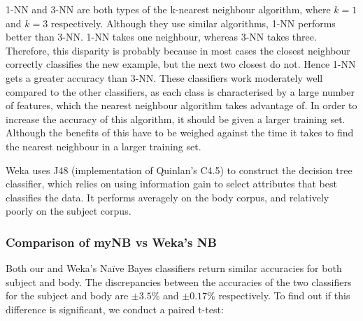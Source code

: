 \documentclass[10pt, a4paper]{article}
\begin{document}
1-NN and 3-NN are both types of the k-nearest neighbour algorithm, where $k = 1$ and $k = 3$ respectively. Although they use similar algorithms, 1-NN performs better than 3-NN. 1-NN takes one neighbour, whereas 3-NN takes three. Therefore, this disparity is probably because in most cases the closest neighbour correctly classifies the new example, but the next two closest do not. Hence 1-NN gets a greater accuracy than 3-NN. These classifiers work moderately well compared to the other classifiers, as each class is characterised by a large number of features, which the nearest neighbour algorithm takes advantage of. In order to increase the accuracy of this algorithm, it should be given a larger training set. Although the benefits of this have to be weighed against the time it takes to find the nearest neighbour in a larger training set. 

Weka uses J48 (implementation of Quinlan's C4.5) to construct the decision tree classifier, which relies on using information gain to select attributes that best classifies the data. It performs averagely on the body corpus, and relatively poorly on the subject corpus.


\subsubsection{Comparison of myNB vs Weka's NB}

Both our and Weka's Na\"ive Bayes classifiers return similar accuracies for both subject and body. The discrepancies between the accuracies of the two classifiers for the subject and body are $\pm 3.5\%$ and $\pm 0.17\%$ respectively. To find out if this difference is significant, we conduct a paired t-test:
\end{document}
